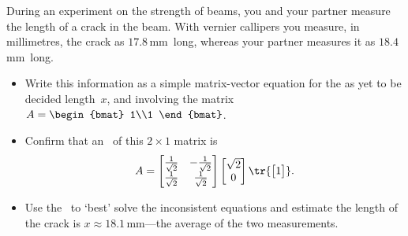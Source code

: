 \sectionExercises


\begin{exercise}  
During an experiment on the strength of beams, you and your partner measure the length of a crack in the beam.
With vernier callipers you measure, in millimetres, the crack as \(17.8\)\,mm~long, whereas your partner measures it as \(18.4\)\,mm~long.
\begin{itemize}
\item Write this information as a simple matrix-vector equation for the as yet to be decided length~\(x\), and involving the matrix \(A=\begin{bmat} 1\\1 \end{bmat}\).
\item Confirm that an \svd\ of this \(2\times1\) matrix is
\begin{equation*}
A=\begin{bmatrix} \frac1{\sqrt2}&-\frac1{\sqrt2}
\\\frac1{\sqrt2}&\frac1{\sqrt2} \end{bmatrix}
\begin{bmatrix} \sqrt2\\0 \end{bmatrix}
\tr{\begin{bmatrix} 1 \end{bmatrix}}.
\end{equation*}
\item Use the \svd\ to `best' solve the inconsistent equations and estimate the length of the crack is \(x\approx 18.1\)\,mm---the average of the two measurements.
\end{itemize}
\end{exercise}



